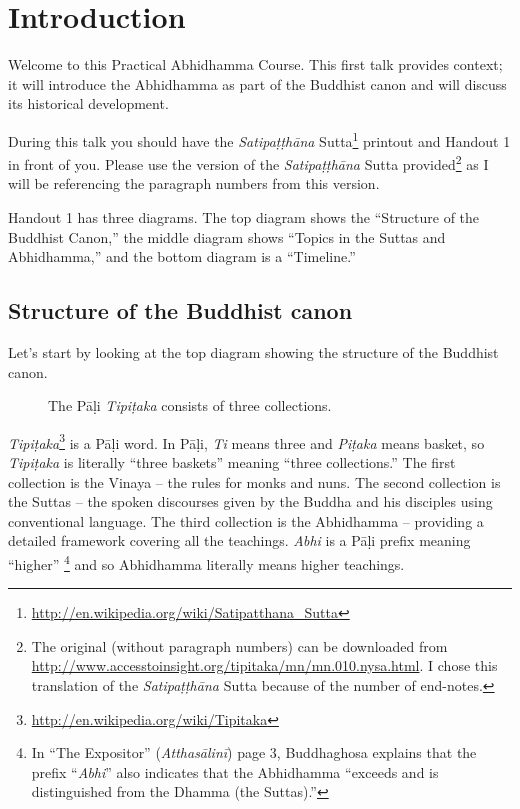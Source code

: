 \section{Introduction}

Welcome to this Practical Abhidhamma Course. This first talk provides context; it will introduce the Abhidhamma as part of the Buddhist canon and will discuss its historical development.

During this talk you should have the \textit{Satipaṭṭhāna} Sutta\footnote{\url{http://en.wikipedia.org/wiki/Satipatthana_Sutta}} printout and Handout 1 in front of you. Please use the version of the \textit{Satipaṭṭhāna} Sutta provided\footnote{The original (without paragraph numbers) can be downloaded from \url{http://www.accesstoinsight.org/tipitaka/mn/mn.010.nysa.html}. I chose this translation of the \textit{Satipaṭṭhāna} Sutta because of the number of end-notes.} as I will be referencing the paragraph numbers from this version.

Handout 1 has three diagrams. The top diagram shows the “Structure of the Buddhist Canon,” the middle diagram shows “Topics in the Suttas and Abhidhamma,” and the bottom diagram is a “Timeline.”

\subsection*{Structure of the Buddhist canon}

Let’s start by looking at the top diagram showing the structure of the Buddhist canon.

\begin{figure}[H]
\centering

\caption{The Pāḷi \textit{Tipiṭaka} consists of three collections.}
\label{fig:Tipitaka}
\end{figure}

\textit{Tipiṭaka}\footnote{\url{http://en.wikipedia.org/wiki/Tipitaka}} is a Pāḷi word. In Pāḷi, \textit{Ti} means three and \textit{Piṭaka} means basket, so \textit{Tipiṭaka} is literally “three baskets” meaning “three collections.” The first collection is the Vinaya – the rules for monks and nuns. The second collection is the Suttas – the spoken discourses given by the Buddha and his disciples using conventional language. The third collection is the Abhidhamma – providing a detailed framework covering all the teachings. \textit{Abhi} is a Pāḷi prefix meaning “higher” \footnote{In “The Expositor” (\textit{Atthasālinī}) page 3, Buddhaghosa explains that the prefix “\textit{Abhi}” also indicates that the Abhidhamma “exceeds and is distinguished from the Dhamma (the Suttas).”} and so Abhidhamma literally means higher teachings.

